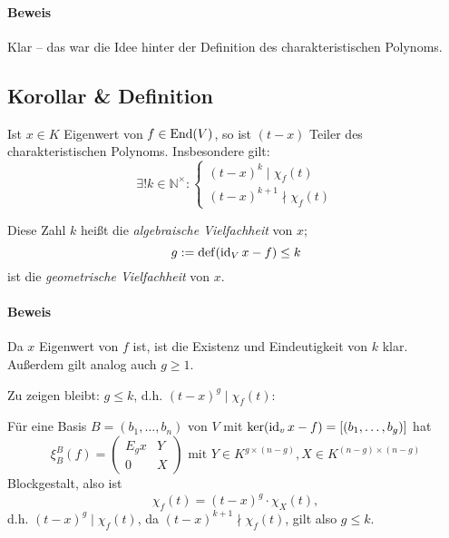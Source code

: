 \paragraph{Beweis}
	Klar -- das war die Idee hinter der Definition des charakteristischen Polynoms.
\subsection{Korollar \& Definition}
\begin{Korollar}
	Ist $ x\in K $ Eigenwert von $ f\in\operatorname{End}(V) $, so ist $ (t-x) $ Teiler des charakteristischen Polynoms. Insbesondere gilt:
		\[ \exists!k\in \mathbb{N}^\times:
			\begin{cases}
				(t-x)^k\mid \chi_f(t)\\
				(t-x)^{k+1}\nmid \chi_f(t)
			\end{cases} \]
\end{Korollar}
\begin{Definition}
	Diese Zahl $ k $ heißt die \emph{algebraische Vielfachheit} von $ x $;
		\[ g:= \operatorname{def}(\operatorname{id}_Vx-f) \leq k \]
	ist die \emph{geometrische Vielfachheit} von $ x $.
\end{Definition}
\paragraph{Beweis}
	Da $ x $ Eigenwert von $ f $ ist, ist die Existenz und Eindeutigkeit von $ k $ klar. Außerdem gilt analog auch $ g\geq 1 $.
	
	Zu zeigen bleibt: $ g\leq k $, d.h. $ (t-x)^g \mid \chi_f(t) $:
	
	Für eine Basis $ B = (b_1,\dots,b_n) $ von $ V $ mit
	$ \ker (\operatorname{id}_v x - f) = [(b_1,\dots,b_g)]$
	hat
		\[ \xi_B^B(f) =
		\begin{pmatrix}
			E_gx & Y\\
			0 & X
		\end{pmatrix}
		\text{ mit } Y\in K^{g\times (n-g)}, X\in K^{(n-g)\times(n-g)} \]
	Blockgestalt, also ist
		\[ \chi_f(t)=(t-x)^g\cdot \chi_X(t), \]
	d.h. $ (t-x)^g \mid \chi_f(t)$, da $ (t-x)^{k+1}\nmid \chi_f(t) $, gilt also $ g\leq k $.
